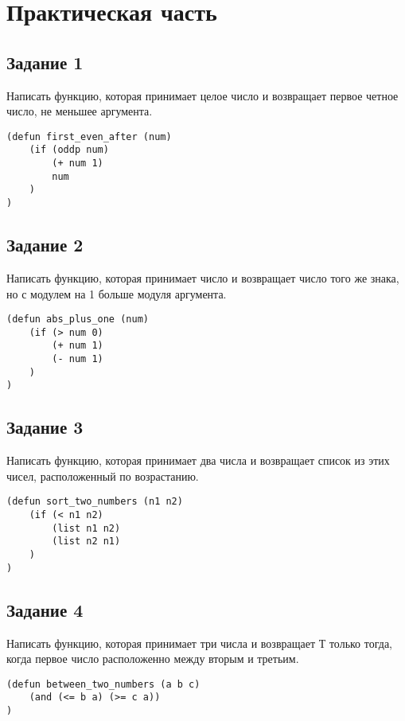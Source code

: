 \chapter{Практическая часть}

\section{Задание \No{}1}

Написать функцию, которая принимает целое число и возвращает первое
четное число, не меньшее аргумента.

\begin{lstlisting}
(defun first_even_after (num)
    (if (oddp num)
        (+ num 1)
        num
    )
)
\end{lstlisting}

\section{Задание \No{}2}


Написать функцию, которая принимает число и возвращает число
того же знака, но с модулем на 1 больше модуля аргумента.

\begin{lstlisting}
(defun abs_plus_one (num)
    (if (> num 0)
        (+ num 1)
        (- num 1)
    )
)
\end{lstlisting}

\section{Задание \No{}3}

Написать функцию, которая принимает два числа и возвращает
список из этих чисел, расположенный по возрастанию.

\begin{lstlisting}
(defun sort_two_numbers (n1 n2)
    (if (< n1 n2)
        (list n1 n2)
        (list n2 n1)
    )
)
\end{lstlisting}

\section{Задание \No{}4}

Написать функцию, которая принимает три числа и возвращает Т только
тогда, когда первое число расположенно между вторым и третьим.

\begin{lstlisting}
(defun between_two_numbers (a b c)
    (and (<= b a) (>= c a))
)
\end{lstlisting}

